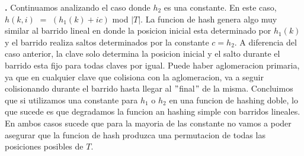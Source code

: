 \documentclass[10pt,a4paper]{article}
\begin{document}
\newline 
\newline
\textbf{.} Continuamos analizando el caso donde $h_{2}$ es una constante.
\newline 
\newline
En este caso, $h(k,i)$ $=$ $(h_{1}(k) + ic)$ mod $|T|$.
\newline 
\newline
La funcion de hash genera algo muy similar al barrido lineal en donde la posicion inicial esta determinado por $h_{1}(k)$ y el barrido realiza saltos determinados por la constante $c = h_{2}$. A diferencia del caso anterior, la clave solo determina la posicion inicial y el salto durante el barrido esta fijo para todas claves por igual.
\newline 
\newline
Puede haber aglomeracion primaria, ya que en cualquier clave que colisiona con la aglomeracion, va a seguir colisionando durante el barrido hasta llegar al $"$final$"$ de la misma.
\newline 
\newline
Concluimos que si utilizamos una constante para $h_{1}$ o $h_{2}$ en una funcion de hashing doble, lo que sucede es que degradamos la funcion an hashing simple con barridos lineales. En ambos casos sucede que para la mayoria de las constante no vamos a poder asegurar que la funcion de hash produzca una permutacion de todas las posiciones posibles de $T$. 






\TipoVariable{}
\end{document}
